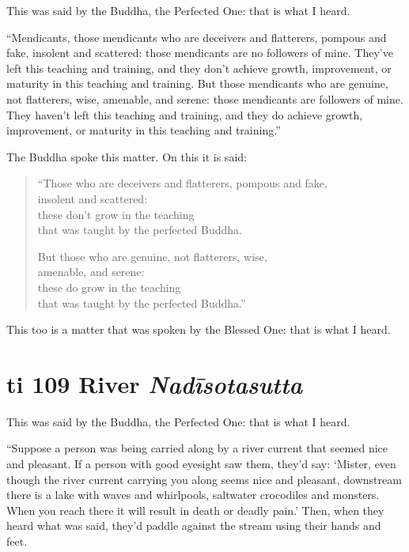 \documentclass[12pt,openany]{book}%
\newcommand*{\suttatitleacronym}[1]{\smaller[2]{#1}\vspace*{.3em}}
\newcommand*{\suttatitletranslation}[1]{\linebreak{#1}}
\newcommand*{\suttatitleroot}[1]{\linebreak\smaller[2]\itshape{#1}}
\newcommand*{\tocacronym}[1]{\hspace*{-3.3em}{#1}\quad}
\newcommand*{\toctranslation}[1]{#1}
\newcommand*{\tocroot}[1]{(\textit{#1})}
\begin{document}
This was said by the Buddha, the Perfected One: that is what I heard. 

“Mendicants, those mendicants who are deceivers and flatterers, pompous and fake, insolent and scattered: those mendicants are no followers of mine. They’ve left this teaching and training, and they don’t achieve growth, improvement, or maturity in this teaching and training. But those mendicants who are genuine, not flatterers, wise, amenable, and serene: those mendicants are followers of mine. They haven’t left this teaching and training, and they do achieve growth, improvement, or maturity in this teaching and training.” 

The Buddha spoke this matter. On this it is said: 

\begin{verse}%
“Those who are deceivers and flatterers, pompous and fake, \\
insolent and scattered: \\
these don’t grow in the teaching \\
that was taught by the perfected Buddha. 

But those who are genuine, not flatterers, wise, \\
amenable, and serene: \\
these do grow in the teaching \\
that was taught by the perfected Buddha.” 

%
\end{verse}

This too is a matter that was spoken by the Blessed One: that is what I heard. 

%
\section*{{\suttatitleacronym Iti 109}{\suttatitletranslation A River }{\suttatitleroot Nadīsotasutta}}
\addcontentsline{toc}{section}{\tocacronym{Iti 109} \toctranslation{A River } \tocroot{Nadīsotasutta}}

This was said by the Buddha, the Perfected One: that is what I heard. 

“Suppose a person was being carried along by a river current that seemed nice and pleasant. If a person with good eyesight saw them, they’d say: ‘Mister, even though the river current carrying you along seems nice and pleasant, downstream there is a lake with waves and whirlpools, saltwater crocodiles and monsters. When you reach there it will result in death or deadly pain.’ Then, when they heard what was said, they’d paddle against the stream using their hands and feet. 
\end{document}
